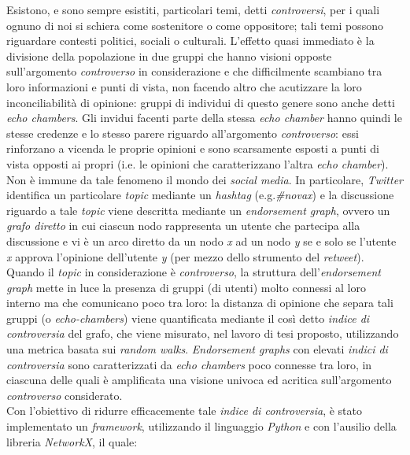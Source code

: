 \documentclass[trieste,12pt]{toptesi}
\begin{document}
\sommario
Esistono, e sono sempre esistiti, particolari temi, detti \textit{controversi}, per i quali ognuno di noi si schiera come sostenitore o come oppositore; tali temi possono riguardare contesti politici, sociali o culturali. L'effetto quasi immediato è la divisione della popolazione in due gruppi che hanno visioni opposte sull'argomento \textit{controverso} in considerazione e che difficilmente scambiano tra loro informazioni e punti di vista, non facendo altro che acutizzare la loro inconciliabilità di opinione: gruppi di individui di questo genere sono anche detti \textit{echo chambers}. Gli invidui facenti parte della stessa \textit{echo chamber} hanno quindi le stesse credenze e lo stesso parere riguardo all'argomento \textit{controverso}: essi rinforzano a vicenda le proprie opinioni e sono scarsamente esposti a punti di vista opposti ai propri (i.e. le opinioni che caratterizzano l'altra \textit{echo chamber}). Non è immune da tale fenomeno il mondo dei \textit{social media}. In particolare, \textit{Twitter} identifica un particolare \textit{topic} mediante un \textit{hashtag} (e.g.\textit{\#novax}) e la discussione riguardo a tale \textit{topic} viene descritta mediante un \textit{endorsement graph}, ovvero un \textit{grafo diretto} in cui ciascun nodo rappresenta un utente che partecipa alla discussione e vi è un arco diretto da un nodo \textit{x} ad un nodo \textit{y} se e solo se l'utente \textit{x} approva l'opinione dell'utente \textit{y} (per mezzo dello strumento del \textit{retweet}). Quando il \textit{topic} in considerazione è \textit{controverso}, la struttura dell'\textit{endorsement graph} mette in luce la presenza di gruppi (di utenti) molto connessi al loro interno ma che comunicano poco tra loro: la distanza di opinione che separa tali gruppi (o \textit{echo-chambers}) viene quantificata mediante il così detto \textit{indice di controversia} del grafo, che viene misurato, nel lavoro di tesi proposto, utilizzando una metrica basata sui \textit{random walks}. \textit{Endorsement graphs} con elevati \textit{indici di controversia} sono caratterizzati da \textit{echo chambers} poco connesse tra loro, in ciascuna delle quali è amplificata una visione univoca ed acritica sull'argomento \textit{controverso} considerato.\\Con l'obiettivo di ridurre efficacemente tale \textit{indice di controversia}, è stato implementato un \textit{framework}, utilizzando il linguaggio \textit{Python} e con l'ausilio della libreria \textit{NetworkX}, il quale:
\end{document}
